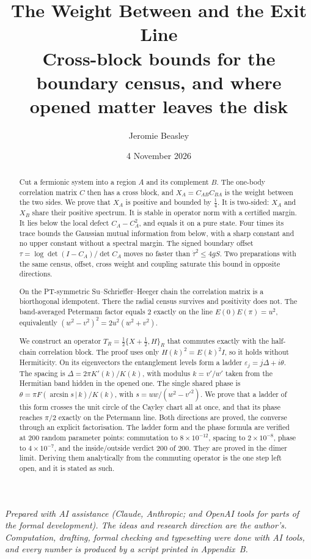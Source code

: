 \documentclass[11pt]{article}
\title{The Weight Between and the Exit Line\\[4pt]\large Cross-block bounds for the boundary census, and where opened matter leaves the disk}
\author{Jeromie Beasley}
\date{4 November 2026}
\theoremstyle{definition}
\begin{document}
\maketitle

\noindent\emph{Prepared with AI assistance (Claude, Anthropic; and OpenAI tools for parts of the formal development). The ideas and research direction are the author's. Computation, drafting, formal checking and typesetting were done with AI tools, and every number is produced by a script printed in Appendix~B.}

\begin{abstract}
Cut a fermionic system into a region $A$ and its complement $B$. The one-body correlation matrix $C$ then has a cross block, and $X_A=C_{AB}C_{BA}$ is the weight between the two sides. We prove that $X_A$ is positive and bounded by $\tfrac14$. It is two-sided: $X_A$ and $X_B$ share their positive spectrum. It is stable in operator norm with a certified margin. It lies below the local defect $C_A-C_A^2$, and equals it on a pure state. Four times its trace bounds the Gaussian mutual information from below, with a sharp constant and no upper constant without a spectral margin. The signed boundary offset $\tau=\log\det(I-C_A)/\det C_A$ moves no faster than $\dot\tau^2\le4gS$. Two preparations with the same census, offset, cross weight and coupling saturate this bound in opposite directions.

On the PT-symmetric Su--Schrieffer--Heeger chain the correlation matrix is a biorthogonal idempotent. There the radial census survives and positivity does not. The band-averaged Petermann factor equals $2$ exactly on the line $E(0)E(\pi)=u^2$, equivalently $(w^2-v^2)^2=2u^2(w^2+v^2)$.

We construct an operator $T_R=\tfrac12\{X+\tfrac12,H\}_R$ that commutes exactly with the half-chain correlation block. The proof uses only $H(k)^2=E(k)^2I$, so it holds without Hermiticity. On its eigenvectors the entanglement levels form a ladder $\varepsilon_j=j\Delta+i\theta$. The spacing is $\Delta=2\pi K'(k)/K(k)$, with modulus $k=v'/w'$ taken from the Hermitian band hidden in the opened one. The single shared phase is $\theta=\pi F(\arcsin s\,|\,k)/K(k)$, with $s=uw/(w^2-v'^2)$. We prove that a ladder of this form crosses the unit circle of the Cayley chart all at once, and that its phase reaches $\pi/2$ exactly on the Petermann line. Both directions are proved, the converse through an explicit factorisation. The ladder form and the phase formula are verified at 200 random parameter points: commutation to $8\times10^{-12}$, spacing to $2\times10^{-8}$, phase to $4\times10^{-7}$, and the inside/outside verdict 200 of 200. They are proved in the dimer limit. Deriving them analytically from the commuting operator is the one step left open, and it is stated as such.
\end{abstract}
\end{document}

